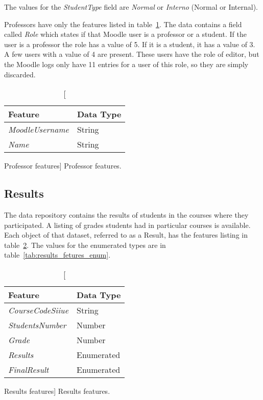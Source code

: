 The values for the \textit{StudentType} field are \textit{Normal} or
\textit{Interno} (Normal or Internal).

Professors have only the features listed in table~\ref{tab:professor_features}.
The data contains a field called \textit{Role} which states if that Moodle user
is a professor or a student. If the user is a professor the role has a value of
5. If it is a student, it has a value of 3. A few users with a value of 4 are
present. These users have the role of editor, but the Moodle logs only have 11
entries for a user of this role, so they are simply discarded.

\begin{table}[h!]
    \centering

    \begin{tabular}{l l}
        Feature                 & Data Type \\ \hline
        \textit{MoodleUsername} & String    \\
        \textit{Name}           & String    \\
    \end{tabular}

    \caption
        [Professor features]
        {Professor features.}

    \label{tab:professor_features}
\end{table}

\subsection{Results}
\label{sec:results}

The data repository contains the results of students in the courses where they
participated. A listing of grades students had in particular courses is
available. Each object of that dataset, referred to as a Result, has the
features listing in table~\ref{tab:results_fetures}. The values for the
enumerated types are in table~\ref{tab:results_fetures_enum}.

\begin{table}[h!]
    \centering

    \begin{tabular}{l l}
        Feature                  & Data Type  \\ \hline
        \textit{CourseCodeSiiue} & String     \\
        \textit{StudentsNumber}  & Number     \\
        \textit{Grade}           & Number     \\
        \textit{Results}         & Enumerated \\
        \textit{FinalResult}     & Enumerated \\
    \end{tabular}

    \caption
        [Results features]
        {Results features.}

    \label{tab:results_fetures}
\end{table}

